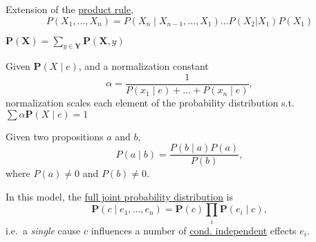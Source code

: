 \documentclass{article}
\begin{document}
\begin{definition}\label{def:chain-rule} Extension of the
  \hyperref[def:prod-rule]{product rule},
  \[
    P(X_1, \dots, X_n) = P(X_n \mid X_{n-1}, \dots, X_1) \dots P(X_2 |
    X_1) P(X_1)
  \]
\end{definition}

\begin{definition}[Marginalisation]\label{def:margin}
  $\mathbf{P}(\mathbf{X}) = \sum_{y \in \mathbf{Y}}
  \mathbf{P}(\mathbf{X}, y)$
\end{definition}

\begin{definition}[Normalisation]\label{def:normalis}
  Given $\mathbf{P}(X \mid e)$, and a normalization constant \[
    \alpha = \frac{1}{ P(x_1 \mid e) + \dots + P(x_n \mid e)}, \]
  normalization scales each element of the probability distribution
  s.t. $\sum \alpha \mathbf{P}(X \mid e) = 1$
\end{definition}

\begin{definition}\label{def:bayes-rule}
  Given two propositions $a$ and $b$,
  \[ P(a \mid b) = \frac{P(b \mid a) P(a)}{P(b)}, \] where
  $P(a) \neq 0$ and $P(b) \neq 0$.
\end{definition}

\begin{definition}\label{def:naive-bayes-model}
  In this model, the \hyperref[def:fjdp]{full joint probability
    distribution} is
  \[ \mathbf{P}(c \mid e_1, \dots, e_n) = \mathbf{P}(c) \prod_i
    \mathbf{P}(e_i \mid c), \] i.e.\ a \emph{single} cause $c$
  influences a number of \hyperref[def:cond-indep]{cond. independent}
  effects $e_i$.
\end{definition}
\end{document}
